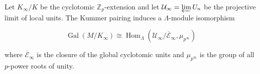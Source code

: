 Let $K_{\infty}/K$ be the cyclotomic $\mathbb{Z}_p$-extension and let $\mathcal{U}_{\infty} = \varprojlim U_n$ be the projective limit of local units. The Kummer pairing induces a $\Lambda$-module isomorphism

$$\operatorname{Gal}(M/K_{\infty}) \cong \operatorname{Hom}_{\Lambda}(\mathcal{U}_{\infty}/\overline{\mathcal{E}}_{\infty}, \mu_{p^{\infty}})$$

where $\overline{\mathcal{E}}_{\infty}$ is the closure of the global cyclotomic units and $\mu_{p^{\infty}}$ is the group of all $p$-power roots of unity.
